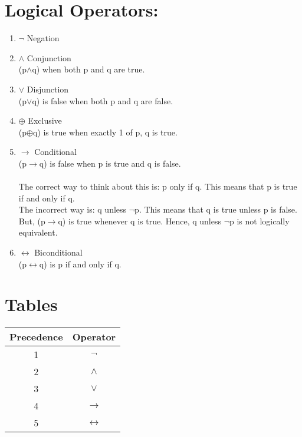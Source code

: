 \documentclass{article}
\begin{document}
\section{Logical Operators:}

\begin{enumerate}
    \item
    $\neg$ Negation
    
    \item
    $\wedge$ Conjunction\\(p$\wedge$q) when both p and q are true.

    \item
    $\vee$ Disjunction\\(p$\vee$q) is false when both p and q are false.

    \item
    $\oplus$ Exclusive\\(p$\oplus$q) is true when exactly 1 of p, q is true.

    \item
    $\to$ Conditional\\(p$\to$q) is false when p is true and q is false.\\
    \\The correct way to think about this is: p only if q. This means that p is true if and only if q.\\
    The incorrect way is: q unless $\neg$p. This means that q is true unless p is false.\\
    But, (p$\to$q) is true whenever q is true. Hence, q unless $\neg$p is not logically equivalent.\\

    \item
    $\leftrightarrow$ Biconditional\\(p$\leftrightarrow$q) is p if and only if q.


\end{enumerate}

\section{Tables}
\begin{center}
\begin{tabular}{||c c||}
    \hline
    Precedence & Operator\\
    \hline
    1 & $\neg$\\
    \hline
    2 & $\wedge$\\
    \hline
    3 & $\vee$\\
    \hline 
    4 & $\to$\\
    \hline
    5 & $\leftrightarrow$\\
    \hline

\end{tabular}
\end{center}
\end{document}
